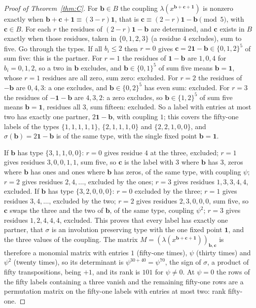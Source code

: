 \documentclass[11pt]{amsart}
\theoremstyle{definition}
\theoremstyle{remark}
\newcommand{\bb}{\mathbf{b}}
\newcommand{\cc}{\mathbf{c}}
\newcommand{\one}{\mathbf{1}}
\begin{document}
\begin{proof}[Proof of Theorem~\ref{thm:C}]
For $\bb\in B$ the coupling $\lambda(x^{\bb+\cc+\one})$ is nonzero exactly
when $\bb+\cc+\one\equiv(3-r)\one$, that is $\cc\equiv(2-r)\one-\bb\pmod5$,
with $\cc\in B$. For each $r$ the residues of $(2-r)\one-\bb$ are
determined, and $\cc$ exists in $B$ exactly when those residues, taken in
$\{0,1,2,3\}$ (a residue $4$ excludes), sum to five. Go through the types.
If all $b_i\le2$ then $r=0$ gives $\cc=2\one-\bb\in\{0,1,2\}^5$ of sum five:
this is the partner. For $r=1$ the residues of $\one-\bb$ are $1,0,4$ for
$b_i=0,1,2$, so a two in $\bb$ excludes, and $\bb\in\{0,1\}^5$ of sum five
means $\bb=\one$, whose $r=1$ residues are all zero, sum zero: excluded. For
$r=2$ the residues of $-\bb$ are $0,4,3$: a one excludes, and $\bb\in\{0,2\}^5$
has even sum: excluded. For $r=3$ the residues of $-\one-\bb$ are $4,3,2$: a
zero excludes, so $\bb\in\{1,2\}^5$ of sum five means $\bb=\one$, residues
all $3$, sum fifteen: excluded. So a label with entries at most two has
exactly one partner, $2\one-\bb$, with coupling $1$; this covers the
fifty-one labels of the types $\{1,1,1,1,1\}$, $\{2,1,1,1,0\}$ and
$\{2,2,1,0,0\}$, and $\sigma(\bb)=2\one-\bb$ is of the same type, with the
single fixed point $\bb=\one$.

If $\bb$ has type $\{3,1,1,0,0\}$: $r=0$ gives residue $4$ at the three,
excluded; $r=1$ gives residues $3,0,0,1,1$, sum five, so $\cc$ is the label
with $3$ where $\bb$ has $3$, zeros where $\bb$ has ones and ones where
$\bb$ has zeros, of the same type, with coupling $\psi$; $r=2$ gives
residues $2,4,\dots$, excluded by the ones; $r=3$ gives residues $1,3,3,4,4$,
excluded. If $\bb$ has type $\{3,2,0,0,0\}$: $r=0$ excluded by the three;
$r=1$ gives residues $3,4,\dots$, excluded by the two; $r=2$ gives residues
$2,3,0,0,0$, sum five, so $\cc$ swaps the three and the two of $\bb$, of the
same type, coupling $\psi^2$; $r=3$ gives residues $1,2,4,4,4$, excluded.
This proves that every label has exactly one partner, that
$\sigma$ is an involution preserving type with the one fixed point $\one$,
and the three values of the coupling. The matrix $M=(\lambda(x^{\bb+\cc+
\one}))_{\bb,\cc}$ is therefore a monomial matrix with entries $1$ (fifty-one
times), $\psi$ (thirty times) and $\psi^2$ (twenty times), so its
determinant is $\psi^{30+40}=\psi^{70}$, the sign of $\sigma$, a product of
fifty transpositions, being $+1$, and its rank is $101$ for
$\psi\ne0$. At $\psi=0$ the rows of the fifty labels containing a three
vanish and the remaining fifty-one rows are a permutation matrix on the
fifty-one labels with entries at most two: rank fifty-one.


\end{proof}
\end{document}
